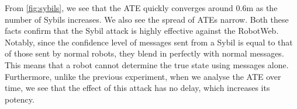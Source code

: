 From \ref{fig:sybils}, we see that the ATE quickly converges around 0.6m as the number of Sybils increases. We also see the spread of ATEs narrow. Both these facts confirm that the Sybil attack is highly effective against the RobotWeb. Notably, since the confidence level of messages sent from a Sybil is equal to that of those sent by normal robots, they blend in perfectly with normal messages. This means that a robot cannot determine the true state using messages alone. Furthermore, unlike the previous experiment, when we analyse the ATE over time, we see that the effect of this attack has no delay, which increases its potency. 

